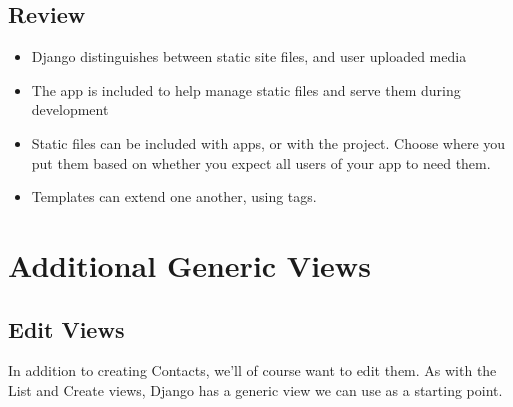 \documentclass[letterpaper,10pt,english]{sphinxmanual}
\begin{document}
\section{Review}
\label{tutorial/static:review}\begin{itemize}
\item {} 
Django distinguishes between static site files, and user uploaded
media

\item {} 
The  app is included to help manage static files and
serve them during development

\item {} 
Static files can be included with apps, or with the project. Choose
where you put them based on whether you expect all users of your app
to need them.

\item {} 
Templates can extend one another, using  tags.

\end{itemize}


\chapter{Additional Generic Views}
\label{tutorial/additional-views:deploying-static-files}\label{tutorial/additional-views::doc}\label{tutorial/additional-views:additional-generic-views}

\section{Edit Views}
\label{tutorial/additional-views:edit-views}
In addition to creating Contacts, we'll of course want to edit them.
As with the List and Create views, Django has a generic view we can
use as a starting point.
\end{document}
